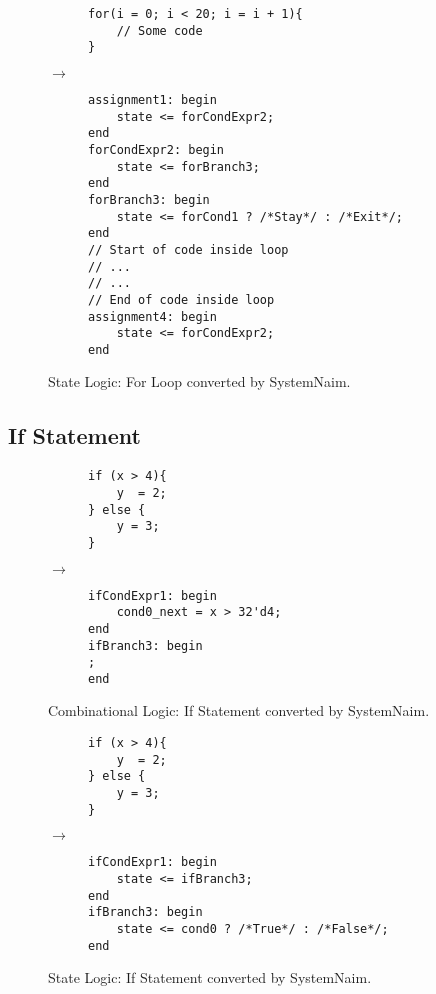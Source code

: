 \begin{figure}[H]
\centering
\begin{subfigure}{0.42\textwidth}
    \centering
    \begin{verbatim}
for(i = 0; i < 20; i = i + 1){
    // Some code
}
    \end{verbatim}
\end{subfigure}%
{\LARGE$\rightarrow$}%
\begin{subfigure}{0.48\textwidth}
    \begin{verbatim}
assignment1: begin
    state <= forCondExpr2;
end
forCondExpr2: begin
    state <= forBranch3;
end
forBranch3: begin
    state <= forCond1 ? /*Stay*/ : /*Exit*/;
end
// Start of code inside loop
// ...
// ...
// End of code inside loop
assignment4: begin
    state <= forCondExpr2;
end
\end{verbatim}
\end{subfigure}
\caption{State Logic: For Loop converted by SystemNaim.}
\label{sn:for_state}
\end{figure}

\subsection{If Statement}

\begin{figure}[H]
\centering
\begin{subfigure}{0.22\textwidth}
    \centering
    \begin{verbatim}
if (x > 4){
    y  = 2;
} else {
    y = 3;
}
\end{verbatim}
\end{subfigure}%
{\LARGE$\rightarrow$}%
\begin{subfigure}{0.45\textwidth}
    \begin{verbatim}
ifCondExpr1: begin
    cond0_next = x > 32'd4;
end
ifBranch3: begin
;
end
    \end{verbatim}
\end{subfigure}
\caption{Combinational Logic: If Statement converted by SystemNaim.}
\label{sn:if}
\end{figure}

\begin{figure}[H]
\centering
\begin{subfigure}{0.22\textwidth}
    \centering
    \begin{verbatim}
if (x > 4){
    y  = 2;
} else {
    y = 3;
}
\end{verbatim}
\end{subfigure}%
{\LARGE$\rightarrow$}%
\begin{subfigure}{0.6\textwidth}
    \begin{verbatim}
ifCondExpr1: begin
    state <= ifBranch3;
end
ifBranch3: begin
    state <= cond0 ? /*True*/ : /*False*/;
end
    \end{verbatim}
\end{subfigure}
\caption{State Logic: If Statement converted by SystemNaim.}
\label{sn:if_state}
\end{figure}

